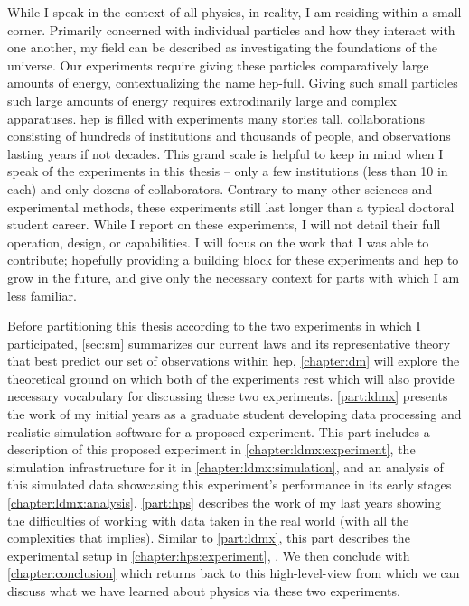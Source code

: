 While I speak in the context of all physics, in reality, I am residing within a small corner.
Primarily concerned with individual particles and how they interact with one another, my field
can be described as investigating the foundations of the universe. Our experiments require giving
these particles comparatively large amounts of energy, contextualizing the name \gls{hep-full}.
Giving such small particles such large amounts of energy requires extrodinarily large and complex
apparatuses. \gls{hep} is filled with experiments many stories tall, collaborations consisting
of hundreds of institutions and thousands of people, and observations lasting years if not decades.
This grand scale is helpful to keep in mind when I speak of the experiments in this thesis -- only
a few institutions (less than 10 in each) and only dozens of collaborators. Contrary to many other
sciences and experimental methods, these experiments still last longer than a typical doctoral
student career. While I report on these experiments, I will not detail their full operation, design,
or capabilities. I will focus on the work that I was able to contribute; hopefully providing a
building block for these experiments and \gls{hep} to grow in the future, and give only the necessary
context for parts with which I am less familiar.

Before partitioning this thesis according to the two experiments in which I participated,
\cref{sec:sm} summarizes our current laws and its representative theory that best predict
our set of observations within \gls{hep},
\cref{chapter:dm} will explore the theoretical ground on which both of the experiments rest which will
also provide necessary vocabulary for discussing these two experiments. \cref{part:ldmx} presents
the work of my initial years as a graduate student developing data processing and realistic simulation
software for a proposed experiment. This part includes a description of this proposed experiment in
\cref{chapter:ldmx:experiment}, the simulation infrastructure for it in \cref{chapter:ldmx:simulation},
and an analysis of this simulated data showcasing this experiment's performance in its early stages \cref{chapter:ldmx:analysis}.
\cref{part:hps} describes the work of my last years showing
the difficulties of working with data taken in the real world (with all the complexities that implies).
Similar to \cref{part:ldmx}, this part describes the experimental setup in \cref{chapter:hps:experiment},
.
We then conclude with \cref{chapter:conclusion} which returns back to this high-level-view
from which we can discuss what we have learned about physics via these two experiments.

